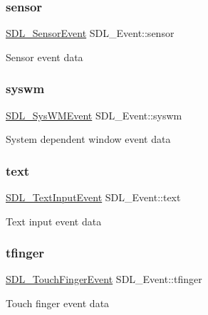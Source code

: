 \subsubsection{\texorpdfstring{sensor}{sensor}}
{\footnotesize\ttfamily \hyperlink{structSDL__SensorEvent}{S\+D\+L\+\_\+\+Sensor\+Event} S\+D\+L\+\_\+\+Event\+::sensor}

Sensor event data \mbox{\label{unionSDL__Event_ab3b2eaf5348d4c50a51b1f297fdef537}} 
\subsubsection{\texorpdfstring{syswm}{syswm}}
{\footnotesize\ttfamily \hyperlink{structSDL__SysWMEvent}{S\+D\+L\+\_\+\+Sys\+W\+M\+Event} S\+D\+L\+\_\+\+Event\+::syswm}

System dependent window event data \mbox{\label{unionSDL__Event_aa4fc65c559d69f33c057c0c23d8414b8}} 
\subsubsection{\texorpdfstring{text}{text}}
{\footnotesize\ttfamily \hyperlink{structSDL__TextInputEvent}{S\+D\+L\+\_\+\+Text\+Input\+Event} S\+D\+L\+\_\+\+Event\+::text}

Text input event data \mbox{\label{unionSDL__Event_ab18d7d60794cb056948ffa58541bc3c5}} 
\subsubsection{\texorpdfstring{tfinger}{tfinger}}
{\footnotesize\ttfamily \hyperlink{structSDL__TouchFingerEvent}{S\+D\+L\+\_\+\+Touch\+Finger\+Event} S\+D\+L\+\_\+\+Event\+::tfinger}

Touch finger event data \mbox{\label{unionSDL__Event_a237648bec242d2d5835f1a4250ddfa46}} 
